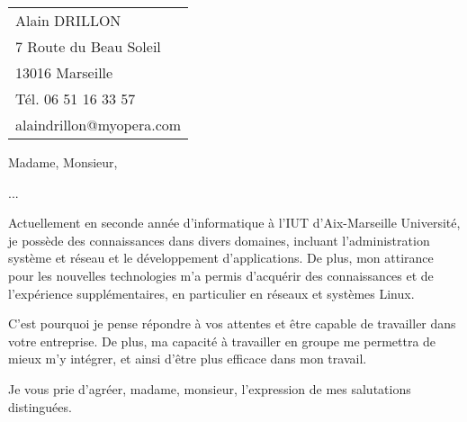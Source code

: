 \documentclass[11pt]{article}
\begin{document}
    \begin{tabular}{l}
        Alain DRILLON \\
        7 Route du Beau Soleil\\
        13016 Marseille\\
        Tél. 06 51 16 33 57\\
        alaindrillon@myopera.com
    \end{tabular}

    \vspace{2cm}

    Madame, Monsieur,
    \vspace{0.75cm}

    ...

    \vspace{0.75cm}
    Actuellement en seconde année d'informatique à l'IUT d'Aix-Marseille Université, je possède des connaissances dans divers domaines, incluant l'administration système et réseau et le développement d'applications.
    De plus, mon attirance pour les nouvelles technologies m'a permis d’acquérir des connaissances et de l'expérience supplémentaires, en particulier en réseaux et systèmes Linux.
   
   C'est pourquoi je pense répondre à vos attentes et être capable de travailler dans votre entreprise. De plus, ma capacité à travailler en groupe me permettra de mieux m'y intégrer, et ainsi d'être plus efficace dans mon travail.

   \vspace{0.50cm}
   Je vous prie d'agréer, madame, monsieur, l'expression de mes salutations distinguées.
\end{document}
